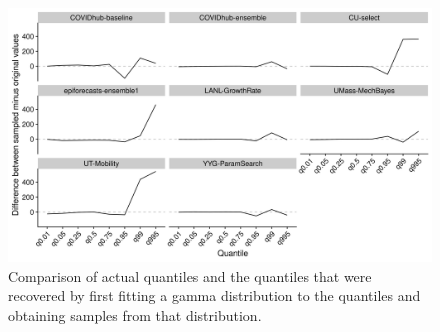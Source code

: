 \documentclass[
]{book}
\begin{document}
\begin{figure}
\includegraphics[width=0.95\linewidth]{../visualisation/chapter-4-ensemble/difference-true-sampled} \caption{Comparison of actual quantiles and the quantiles that were recovered by first fitting a gamma distribution to the quantiles and obtaining samples from that distribution.}\label{fig:difference-true-sampled}
\end{figure}
\end{document}
